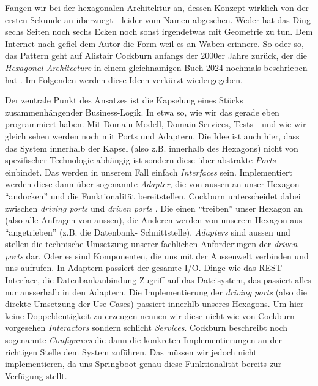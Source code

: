 Fangen wir bei der hexagonalen Architektur an, dessen Konzept wirklich von 
der ersten Sekunde an überzuegt - leider vom Namen abgesehen. Weder hat das
Ding sechs Seiten noch sechs Ecken noch sonst irgendetwas mit Geometrie zu tun.
Dem Internet nach gefiel dem Autor die Form weil es an Waben erinnere. So oder
so, das Pattern geht auf Alistair Cockburn anfangs der 2000er Jahre zurück,
der die \textit{Hexagonal Architecture} in einem gleichnamigen Buch 2024
nochmals beschrieben hat \cite{cockburn_2024}. Im Folgenden werden diese
Ideen verkürzt wiedergegeben.

Der zentrale Punkt des Ansatzes ist die Kapselung eines Stücks zusammenhängender
Business-Logik. In etwa so, wie wir das gerade eben programmiert haben. Mit
Domain-Modell, Domain-Services, Tests - und wie wir gleich sehen werden noch
mit Ports und Adaptern. Die Idee ist auch hier, dass das System innerhalb der
Kapsel (also z.B. innerhalb des Hexagons) nicht von spezifischer Technologie
abhängig ist sondern diese über abstrakte \textit{Ports} einbindet. Das werden
in unserem Fall einfach \textit{Interfaces} sein. Implementiert werden diese
dann über sogenannte \textit{Adapter}, die von aussen an unser Hexagon
``andocken'' und die Funktionalität bereitstellen. Cockburn unterscheidet dabei
zwischen \textit{driving ports} und \textit{driven ports} \cite{cockburn_2024}.
Die einen ``treiben'' unser Hexagon an (also alle Anfragen von aussen), die
Anderen werden von unserem Hexagon aus ``angetrieben'' (z.B. die Datenbank-
Schnittstelle). \textit{Adapters} sind aussen und stellen die technische 
Umsetzung unserer fachlichen Anforderungen der \textit{driven ports} dar.
Oder es sind Komponenten, die uns mit der Aussenwelt verbinden und uns
aufrufen. In Adaptern passiert der gesamte I/O. Dinge wie das REST-Interface,
die Datenbankanbindung Zugriff auf das Dateisystem, das passiert alles 
nur ausserhalb in den Adaptern. Die Implementierung der \textit{driving ports}
(also die direkte Umsetzung der Use-Cases) passiert innerhlb unseres 
Hexagons. Um hier keine Doppeldeutigkeit zu erzeugen nennen wir diese
nicht wie von Cockburn vorgesehen \textit{Interactors} sondern schlicht
\textit{Services}. Cockburn beschreibt 
noch sogenannte \textit{Configurers} die dann die konkreten Implementierungen
an der richtigen Stelle dem System zuführen. Das müssen wir jedoch nicht
implementieren, da uns Springboot genau diese Funktionalität bereits zur
Verfügung stellt.

